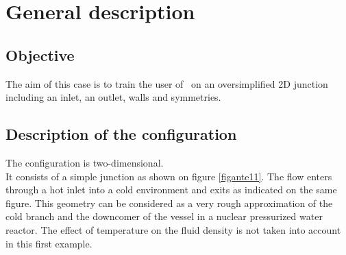 %
% 
%
% 
% 
% 
%
\section{General description}


	\subsection{Objective}
The aim of this case is to train the user of \CS\ on an oversimplified 2D junction
including an inlet, an outlet, walls and symmetries.

	\subsection{Description of the configuration}

The configuration is two-dimensional.\\
It consists of a simple junction as shown on figure \ref{figante11}.
The flow enters through a hot inlet into a cold
environment and exits as indicated on the same figure. This geometry can be
considered as a very rough approximation of the cold branch and the downcomer of
the vessel in a nuclear pressurized water reactor. The effect of temperature on
the fluid density is not taken into account in this first example.

